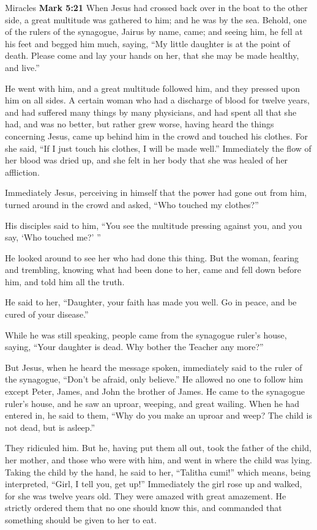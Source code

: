 \documentclass[10pt,twoside]{article} %
\newcommand{\quotesize}{\normalsize{}}
\newenvironment{quotetext}{\begingroup\quotesize}{\endgroup}
\newcommand{\bible}[2]{\begin{quotetext}\textbf{#1} #2\end{quotetext}}
\newcommand{\gospelmark}[2]{\bible{Mark #1}{#2}}
\begin{document}
\begin{section}{Miracles}
\gospelmark{5:21}{
  When Jesus had crossed back over in the boat to the other side, a great multitude was gathered to him; and he was by the sea.   Behold, one of the rulers of the synagogue, Jairus by name, came; and seeing him, he fell at his feet   and begged him much, saying, ``My little daughter is at the point of death. Please come and lay your hands on her, that she may be made healthy, and live.''

  He went with him, and a great multitude followed him, and they pressed upon him on all sides.   A certain woman who had a discharge of blood for twelve years,   and had suffered many things by many physicians, and had spent all that she had, and was no better, but rather grew worse,   having heard the things concerning Jesus, came up behind him in the crowd and touched his clothes.   For she said, ``If I just touch his clothes, I will be made well.''   Immediately the flow of her blood was dried up, and she felt in her body that she was healed of her affliction.

  Immediately Jesus, perceiving in himself that the power had gone out from him, turned around in the crowd and asked, ``Who touched my clothes?''

  His disciples said to him, ``You see the multitude pressing against you, and you say, `Who touched me?' ''

  He looked around to see her who had done this thing.   But the woman, fearing and trembling, knowing what had been done to her, came and fell down before him, and told him all the truth.

  He said to her, ``Daughter, your faith has made you well. Go in peace, and be cured of your disease.''

  While he was still speaking, people came from the synagogue ruler's house, saying, ``Your daughter is dead. Why bother the Teacher any more?''

  But Jesus, when he heard the message spoken, immediately said to the ruler of the synagogue, ``Don't be afraid, only believe.''   He allowed no one to follow him except Peter, James, and John the brother of James.   He came to the synagogue ruler's house, and he saw an uproar, weeping, and great wailing.   When he had entered in, he said to them, ``Why do you make an uproar and weep? The child is not dead, but is asleep.''

  They ridiculed him. But he, having put them all out, took the father of the child, her mother, and those who were with him, and went in where the child was lying.   Taking the child by the hand, he said to her, ``Talitha cumi!'' which means, being interpreted, ``Girl, I tell you, get up!''   Immediately the girl rose up and walked, for she was twelve years old. They were amazed with great amazement.   He strictly ordered them that no one should know this, and commanded that something should be given to her to eat.}


\end{section}
\end{document}

